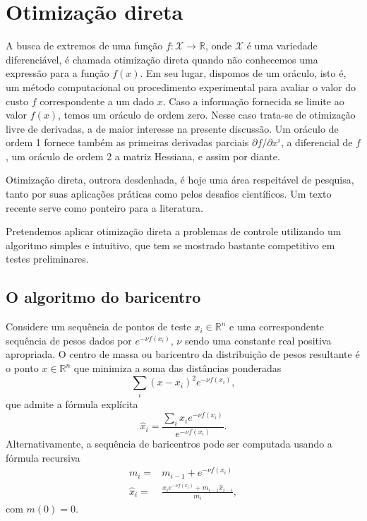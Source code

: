 \documentclass{tufte-handout}
\author[F Pait]{F Pait}
\def\R{\mathbb{R}}
\def\X{\mathcal{X}}
\begin{document}


\section{Otimização direta}
A busca de extremos de uma função $f: \X \rightarrow \R$, onde $\X$ é uma variedade diferenciável, é chamada otimização direta quando não conhecemos uma expressão para a função $f(x)$. Em seu lugar, dispomos de um oráculo, isto é, um método computacional ou procedimento experimental para avaliar o valor do custo $f$ correspondente a um dado $x$. Caso a informação fornecida se limite ao valor $f(x)$, temos um oráculo de ordem zero. Nesse caso trata-se de otimização livre de derivadas, a de maior interesse na presente discussão.  Um oráculo de ordem 1 fornece também as primeiras derivadas parciais $\partial f / \partial x^i$, a diferencial de $f$, um oráculo de ordem 2 a matriz Hessiana, e assim por diante. 

Otimização direta, outrora desdenhada\cite{once-scorned}, é hoje uma área respeitável de pesquisa, tanto por suas aplicações práticas como pelos desafios científicos. Um texto recente \cite{derivative-free-book} serve como ponteiro para a literatura. 

Pretendemos aplicar otimização direta a problemas de controle utilizando um algoritmo simples e intuitivo, que tem se mostrado bastante competitivo em testes preliminares. 

\subsection{O algoritmo do baricentro} Considere um sequência de pontos de teste $x_i \in \R^n$ e uma correspondente sequência de pesos dados por $e^{-\nu f(x_i)}$, $\nu$ sendo uma constante real positiva apropriada. O centro de massa ou baricentro da distribuição de pesos resultante é o ponto $x\in \R^n$ que minimiza a soma das distâncias ponderadas 
\begin{equation}
\label{eq:sum-of-distances}
\sum_i (x - x_i)^2 e^{-\nu f(x_i)},
\end{equation}
que admite a fórmula explícita
\begin{equation}
\label{eq:barycenter}
\hat{x}_i = \frac{\sum_i x_i e^{-\nu f(x_i)}} {e^{-\nu f(x_i)}}.
\end{equation}
Alternativamente, a sequência de baricentros  pode ser computada usando a fórmula recursiva
\begin{align}
\label{eq:barycenter-recursive}
m_i = & m_{i-1} + e^{-\nu f(x_i)}\\
\hat{x}_i = & \frac{ x_i e^{-\nu f(x_i)}+ m_{i-1}\hat{x}_{i-i}} {m_i},
\end{align}
com $m(0)= 0$.
\end{document}
